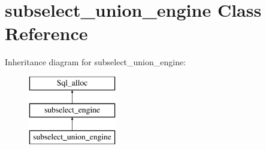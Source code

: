 \hypertarget{classsubselect__union__engine}{}\section{subselect\+\_\+union\+\_\+engine Class Reference}
\label{classsubselect__union__engine}
Inheritance diagram for subselect\+\_\+union\+\_\+engine\+:\begin{figure}[H]
\begin{center}
\leavevmode
\includegraphics[height=3.000000cm]{classsubselect__union__engine}
\end{center}
\end{figure}
